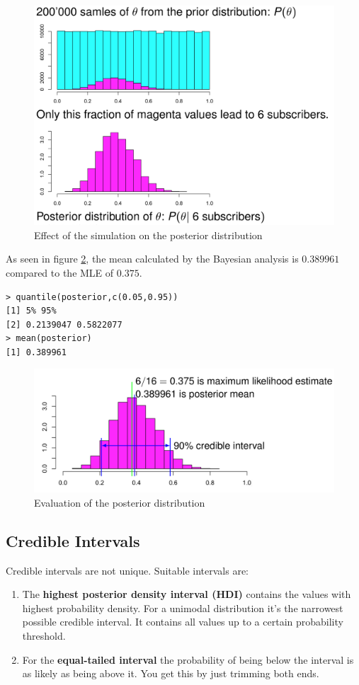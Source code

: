 \documentclass[11pt]{article}
\begin{document}
\begin{figure}[hb]
	\centering
	\includegraphics[width=0.6\linewidth, keepaspectratio]{img/effect_sampling_posterior}
	\caption{Effect of the simulation on the posterior distribution}
	\label{fig:effectsamplingposterior}
\end{figure}

As seen in figure \ref{fig:evaluationposteriordistribution}, the mean calculated by the Bayesian analysis is $0.389961$ compared to the MLE of $0.375$.

\begin{verbatim}
> quantile(posterior,c(0.05,0.95))
[1] 5% 95%
[2] 0.2139047 0.5822077
> mean(posterior)
[1] 0.389961
\end{verbatim}

\begin{figure}[tbh]
	\centering
	\includegraphics[width=0.6\linewidth]{img/evaluation_posterior_distribution}
	\caption{Evaluation of the posterior distribution}
	\label{fig:evaluationposteriordistribution}
\end{figure}

\subsection{Credible Intervals}

Credible intervals are not unique. Suitable intervals are:

\begin{enumerate}
	\item The \textbf{highest posterior density interval (HDI)} contains the values with highest probability density. For a unimodal distribution it’s the narrowest possible credible interval. It contains all values up to a certain probability threshold.
	\item For the \textbf{equal-tailed interval} the probability of being below the interval is as likely as being above it. You get this by just trimming both ends.
\end{enumerate}
\end{document}
